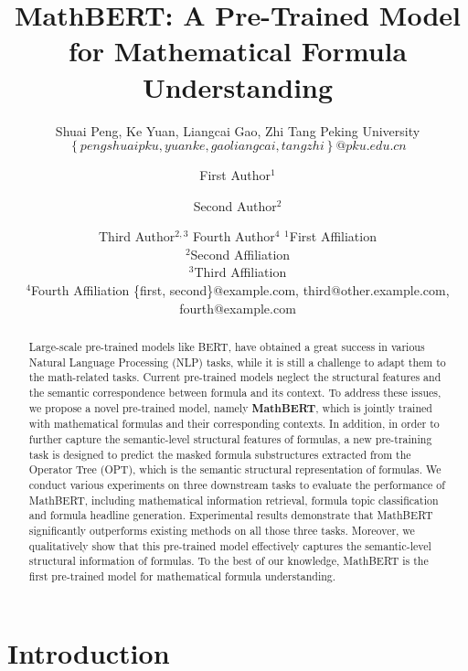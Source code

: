 \documentclass{article}
\title{MathBERT: A Pre-Trained Model for Mathematical Formula Understanding}
\author{
    Shuai Peng, Ke Yuan, Liangcai Gao, Zhi Tang
    \affiliations
    Peking University
    \emails
    $\left\{pengshuaipku,yuanke,gaoliangcai,tangzhi\right\}@pku.edu.cn$
}
\author{
First Author$^1$
\and
Second Author$^2$\and
Third Author$^{2,3}$\And
Fourth Author$^4$
\affiliations
$^1$First Affiliation\\
$^2$Second Affiliation\\
$^3$Third Affiliation\\
$^4$Fourth Affiliation
\emails
\{first, second\}@example.com,
third@other.example.com,
fourth@example.com
}
\begin{document}
\maketitle

\begin{abstract}
Large-scale pre-trained models like BERT, have obtained a great success in various Natural Language Processing (NLP) tasks, while it is still a challenge to adapt them to the math-related tasks. Current pre-trained models neglect the structural features and the semantic correspondence between formula and its context. To address these issues, we propose a novel pre-trained model, namely \textbf{MathBERT}, which is jointly trained with mathematical formulas and their corresponding contexts. In addition, in order to further capture the semantic-level structural features of formulas, a new pre-training task is designed to predict the masked formula substructures extracted from the Operator Tree (OPT), which is the semantic structural representation of formulas. We conduct various experiments on three downstream tasks to evaluate the performance of MathBERT, including mathematical information retrieval, formula topic classification and formula headline generation. Experimental results demonstrate that MathBERT significantly outperforms existing methods on all those three tasks. Moreover, we qualitatively show that this pre-trained model effectively captures the semantic-level structural information of formulas. To the best of our knowledge, MathBERT is the first pre-trained model for mathematical formula understanding.
  
\end{abstract}

\section{Introduction} \label{section:introduction}
\end{document}
